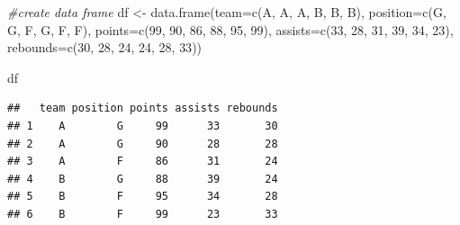 \documentclass[
]{book}
\newenvironment{Shaded}{\begin{snugshade}}{\end{snugshade}}
\newcommand{\AttributeTok}[1]{\textcolor[rgb]{0.77,0.63,0.00}{#1}}
\newcommand{\CommentTok}[1]{\textcolor[rgb]{0.56,0.35,0.01}{\textit{#1}}}
\newcommand{\DecValTok}[1]{\textcolor[rgb]{0.00,0.00,0.81}{#1}}
\newcommand{\FunctionTok}[1]{\textcolor[rgb]{0.00,0.00,0.00}{#1}}
\newcommand{\NormalTok}[1]{#1}
\newcommand{\OtherTok}[1]{\textcolor[rgb]{0.56,0.35,0.01}{#1}}
\newcommand{\SpecialCharTok}[1]{\textcolor[rgb]{0.00,0.00,0.00}{#1}}
\newcommand{\StringTok}[1]{\textcolor[rgb]{0.31,0.60,0.02}{#1}}
\theoremstyle{definition}
\theoremstyle{definition}
\theoremstyle{definition}
\theoremstyle{definition}
\theoremstyle{remark}
\begin{document}
\begin{Shaded}
\begin{Highlighting}[]
\CommentTok{\#create data frame}
\NormalTok{df }\OtherTok{\textless{}{-}} \FunctionTok{data.frame}\NormalTok{(}\AttributeTok{team=}\FunctionTok{c}\NormalTok{(}\StringTok{\textquotesingle{}A\textquotesingle{}}\NormalTok{, }\StringTok{\textquotesingle{}A\textquotesingle{}}\NormalTok{, }\StringTok{\textquotesingle{}A\textquotesingle{}}\NormalTok{, }\StringTok{\textquotesingle{}B\textquotesingle{}}\NormalTok{, }\StringTok{\textquotesingle{}B\textquotesingle{}}\NormalTok{, }\StringTok{\textquotesingle{}B\textquotesingle{}}\NormalTok{),}
                 \AttributeTok{position=}\FunctionTok{c}\NormalTok{(}\StringTok{\textquotesingle{}G\textquotesingle{}}\NormalTok{, }\StringTok{\textquotesingle{}G\textquotesingle{}}\NormalTok{, }\StringTok{\textquotesingle{}F\textquotesingle{}}\NormalTok{, }\StringTok{\textquotesingle{}G\textquotesingle{}}\NormalTok{, }\StringTok{\textquotesingle{}F\textquotesingle{}}\NormalTok{, }\StringTok{\textquotesingle{}F\textquotesingle{}}\NormalTok{),}
                 \AttributeTok{points=}\FunctionTok{c}\NormalTok{(}\DecValTok{99}\NormalTok{, }\DecValTok{90}\NormalTok{, }\DecValTok{86}\NormalTok{, }\DecValTok{88}\NormalTok{, }\DecValTok{95}\NormalTok{, }\DecValTok{99}\NormalTok{),}
                 \AttributeTok{assists=}\FunctionTok{c}\NormalTok{(}\DecValTok{33}\NormalTok{, }\DecValTok{28}\NormalTok{, }\DecValTok{31}\NormalTok{, }\DecValTok{39}\NormalTok{, }\DecValTok{34}\NormalTok{, }\DecValTok{23}\NormalTok{),}
                 \AttributeTok{rebounds=}\FunctionTok{c}\NormalTok{(}\DecValTok{30}\NormalTok{, }\DecValTok{28}\NormalTok{, }\DecValTok{24}\NormalTok{, }\DecValTok{24}\NormalTok{, }\DecValTok{28}\NormalTok{, }\DecValTok{33}\NormalTok{))}

\NormalTok{df}
\end{Highlighting}
\end{Shaded}

\begin{verbatim}
##   team position points assists rebounds
## 1    A        G     99      33       30
## 2    A        G     90      28       28
## 3    A        F     86      31       24
## 4    B        G     88      39       24
## 5    B        F     95      34       28
## 6    B        F     99      23       33
\end{verbatim}

\begin{Shaded}
\end{Shaded}
\end{document}
